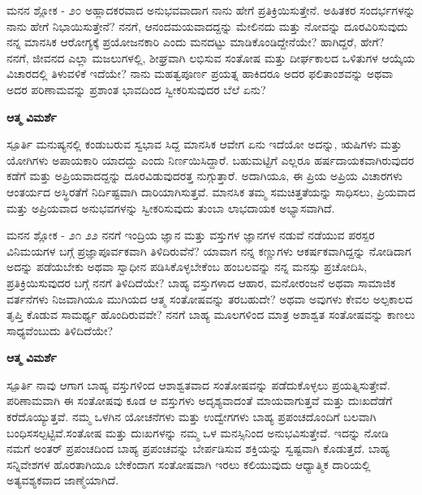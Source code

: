 \begin{mananam}{\mananamfont \large ಮನನ ಶ್ಲೋಕ - ೨೦}
\footnotesize \mananamtext ಅಹ್ಲಾದಕರವಾದ ಅನುಭವವಾದಾಗ ನಾನು ಹೇಗೆ  ಪ್ರತಿಕ್ರಿಯಿಸುತ್ತೇನೆ.  ಅಹಿತಕರ ಸಂದರ್ಭಗಳನ್ನು  ನಾನು ಹೇಗೆ ನಿಭಾಯಿಸುತ್ತೇನೆ? ನನಗೆ, ಆನಂದಮಯವಾದದ್ದನ್ನು  ಮೇಲಿನದು ಮತ್ತು ನೋವನ್ನು ದೂರವಿರಿಸುವುದು ನನ್ನ ಮಾನಸಿಕ ಆರೋಗ್ಯಕ್ಕೆ ಪ್ರಯೋಜನಕಾರಿ ಎಂದು ಮನದಟ್ಟು ಮಾಡಿಕೊಂಡಿದ್ದೇನೆಯೇ? ಹಾಗಿದ್ದರೆ, ಹೇಗೆ?\\
ನನಗೆ, ಜೀವನದ ಎಲ್ಲಾ ಮಜಲುಗಳಲ್ಲಿ, ಶೀಘ್ರವಾಗಿ ಲಭಿಸುವ ಸಂತೋಷ ಮತ್ತು ದೀರ್ಘಕಾಲದ ಒಳಿತುಗಳ ಆಯ್ಕೆಯ ವಿಚಾರದಲ್ಲಿ ತಿಳುವಳಿಕೆ ಇದೆಯೇ? ನಾನು ಮಹತ್ವಪೂರ್ಣ ಪ್ರಯತ್ನ ಹಾಕಿದರೂ ಅದರ ಫಲಿತಾಂಶವನ್ನು ಅಥವಾ ಅದರ ಪರಿಣಾಮವನ್ನು ಪ್ರಶಾಂತ ಭಾವದಿಂದ ಸ್ವೀಕರಿಸುವುದರ ಬೆಲೆ ಏನು?
\end{mananam}
\WritingHand\enspace\textbf{ಆತ್ಮ ವಿಮರ್ಶೆ}\\
\begin{inspiration}{\mananamfont \large ಸ್ಪೂರ್ತಿ}
\footnotesize \mananamtext ಮನುಷ್ಯನಲ್ಲಿ ಕಂಡುಬರುವ ಸ್ವಭಾವ ಸಿದ್ದ ಮಾನಸಿಕ ಆವೇಗ ಏನು ಇದೆಯೋ ಅದನ್ನು, ಋಷಿಗಳು ಮತ್ತು ಯೋಗಿಗಳು ಅಪಾಯಕಾರಿ ಯಾದದ್ದು ಎಂದು  ನಿರ್ಣಯಿಸಿದ್ದಾರೆ.  ಬಹುಮಟ್ಟಿಗೆ ಎಲ್ಲರೂ ಹರ್ಷದಾಯಕವಾಗಿರುವುದರ ಕಡೆಗೆ ಮತ್ತು ಅಪ್ರಿಯವಾದದ್ದನ್ನು ದೂರವಿಡುವುದರತ್ತ ನುಗ್ಗುತ್ತಾರೆ. ಅದಾಗಿಯೂ,  ಈ ಪ್ರಿಯ ಅಪ್ರಿಯ  ವಿಚಾರಗಳು ಆಂತರ್ಯದ ಅಸ್ಥಿರತೆಗೆ ನಿರ್ದಿಷ್ಟವಾಗಿ ದಾರಿಯಾಗಿಸುತ್ತವೆ. ಮಾನಸಿಕ ತಮ್ಮ ಸಮಚಿತ್ತತೆಯನ್ನು  ಸಾಧಿಸಲು, ಪ್ರಿಯವಾದ ಮತ್ತು ಅಪ್ರಿಯವಾದ ಅನುಭವಗಳನ್ನು ಸ್ವೀಕರಿಸುವುದು ತುಂಬಾ ಲಾಭದಾಯಕ ಅಭ್ಯಾಸವಾಗಿದೆ.
\end{inspiration}
\newpage

\begin{mananam}{\mananamfont \large ಮನನ ಶ್ಲೋಕ - ೨೧ ೨೨}
\footnotesize \mananamtext ನನಗೆ ಇಂದ್ರಿಯ ಜ್ಞಾನ  ಮತ್ತು ವಸ್ತುಗಳ ಜ್ಞಾನಗಳ ನಡುವೆ ನಡೆಯುವ ಪರಸ್ಪರ ವಿನಿಮಯಗಳ ಬಗ್ಗೆ ಪ್ರಜ್ಞಾಪೂರ್ವಕವಾಗಿ  ತಿಳಿದಿರುವೆನೆ? ಯಾವಾಗ ನನ್ನ ಕಣ್ಣುಗಳು ಆಕರ್ಷಕವಾಗಿದ್ದನ್ನು ನೋಡಿದಾಗ ಅದನ್ನು ಪಡೆಯಬೇಕು ಅಥವಾ ಸ್ವಾಧೀನ ಪಡಿಸಿಕೊಳ್ಳಬೇಕೆಂಬ ಹಂಬಲವನ್ನು ನನ್ನ ಮನಸ್ಸು ಪ್ರಚೋದಿಸಿ, ಪ್ರತಿಕ್ರಿಯಿಸುವುದರ ಬಗ್ಗೆ ನನಗೆ ತಿಳಿದಿದೆಯೇ? ಬಾಹ್ಯ ವಸ್ತುಗಳಾದ ಆಹಾರ, ಮನೋರಂಜನೆ ಅಥವಾ ಸಾಮಾಜಿಕ ವರ್ತನೆಗಳು ನಿಜವಾಗಿಯೂ ಮುಗಿಯದ ಆತ್ಮ ಸಂತೋಷವನ್ನು ತರಬಹುದೇ? ಅಥವಾ ಅವುಗಳು ಕೇವಲ ಅಲ್ಪಕಾಲದ ತೃಪ್ತಿ ಕೊಡುವ ಸಾಮರ್ಥ್ಯ ಹೊಂದಿರುವವೇ? ನನಗೆ ಬಾಹ್ಯ ಮೂಲಗಳಿಂದ ಮಾತ್ರ ಅಶಾಶ್ವತ ಸಂತೋಷವನ್ನು ಕಾಣಲು ಸಾಧ್ಯವೆಂಬುದು ತಿಳಿದಿದೆಯೇ?
\end{mananam}
\WritingHand\enspace\textbf{ಆತ್ಮ ವಿಮರ್ಶೆ}\\
\begin{inspiration}{\mananamfont \large ಸ್ಪೂರ್ತಿ}
\ssmall \mananamtext ನಾವು ಆಗಾಗ ಬಾಹ್ಯ ವಸ್ತುಗಳಿಂದ ಆಶಾಶ್ವತವಾದ ಸಂತೋಷವನ್ನು ಪಡೆದುಕೊಳ್ಳಲು ಪ್ರಯತ್ನಿಸುತ್ತೇವೆ. ಪರಿಣಾಮವಾಗಿ ಈ ಸಂತೋಷವು ಕೂಡ ಆ ವಸ್ತುಗಳು ಅದೃಶ್ಯವಾದಂತೆ ಮಾಯವಾಗುತ್ತವೆ ಮತ್ತು ದುಃಖದೆಡೆಗೆ ಕರೆದೊಯ್ಯುತ್ತವೆ. ನಮ್ಮ ಒಳಗಿನ ಯೋಚನೆಗಳು ಮತ್ತು ಉದ್ವೇಗಗಳು ಬಾಹ್ಯ  ಪ್ರಪಂಚದೊಂದಿಗೆ ಬಲವಾಗಿ ಬಂಧಿಸಸಲ್ಪಟ್ಟಿವೆ.ಸಂತೋಷ ಮತ್ತು ದುಃಖಗಳನ್ನು ನಮ್ಮ ಒಳ ಮನಸ್ಸಿನಿಂದ ಅನುಭವಿಸುತ್ತೇವೆ. ಇದನ್ನು ನೋಡಿ ನಮಗೆ ಅಂತರ್ ಪ್ರಪಂಚದಿಂದ ಬಾಹ್ಯ ಪ್ರಪಂಚವನ್ನು ಬೇರ್ಪಡಿಸುವ ಶಕ್ತಿಯನ್ನು ಸ್ವಷ್ಟವಾಗಿ ಕೊಡುತ್ತದೆ.  ಬಾಹ್ಯ ಸನ್ನಿವೇಶಗಳ ಹೊರತಾಗಿಯೂ ಬೇಕೆಂದಾಗ ಸಂತೋಷವಾಗಿ ಇರಲು ಕಲಿಯುವುದು ಆಧ್ಯಾತ್ಮಿಕ ದಾರಿಯಲ್ಲಿ ಅತ್ಯವಶ್ಯಕವಾದ ಜಾಣ್ಮೆಯಾಗಿದೆ.
\end{inspiration}
\newpage

